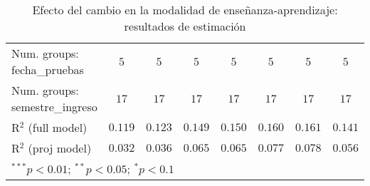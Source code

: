 \begin{table}
\begin{center}
\begin{tabular}{l c c c c c c c}
Num. groups: fecha\_pruebas                & $5$            & $5$           & $5$            & $5$            & $5$           & $5$           & $5$           \\
Num. groups: semestre\_ingreso             & $17$           & $17$          & $17$           & $17$           & $17$          & $17$          & $17$          \\
R$^2$ (full model)                         & $0.119$        & $0.123$       & $0.149$        & $0.150$        & $0.160$       & $0.161$       & $0.141$       \\
R$^2$ (proj model)                         & $0.032$        & $0.036$       & $0.065$        & $0.065$        & $0.077$       & $0.078$       & $0.056$       \\
\hline
\multicolumn{8}{l}{\scriptsize{$^{***}p<0.01$; $^{**}p<0.05$; $^{*}p<0.1$}}
\end{tabular}
\caption{Efecto del cambio en la modalidad de enseñanza-aprendizaje: resultados de estimación}
\label{tab:regresiones_efectos_fijos}
\end{center}
\end{table}
